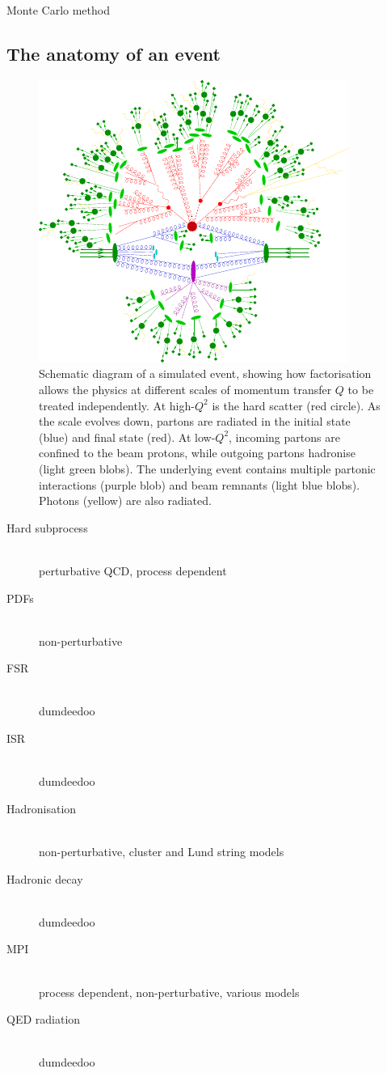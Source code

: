 
\cite{MCnet:general}

Monte Carlo method

\subsection{The anatomy of an event}

\begin{figure}
	\includegraphics[width=\largefigwidth]{tex/tools/event}
	\caption{Schematic diagram of a simulated \ttH event, showing how factorisation allows 
	the physics at different scales of momentum transfer $Q$ to be treated independently.
	At high-$Q^2$ is the hard scatter (red circle). As the scale evolves down, partons are 
	radiated in the initial state (blue) and final state (red). At low-$Q^2$, incoming 
	partons are confined to the beam protons, while outgoing partons hadronise (light 
	green blobs). The underlying event contains multiple partonic interactions (purple 
	blob) and beam remnants (light blue blobs). Photons (yellow) are also radiated.}
	\label{fig:mcevent}
\end{figure}

\begin{description}
\item[Hard subprocess] \hfill \\
	perturbative QCD, process dependent
\item[\acp{PDF}] \hfill \\
	non-perturbative
\item[\ac{FSR}] \hfill \\
	dumdeedoo
\item[\ac{ISR}] \hfill \\
	dumdeedoo
\item[Hadronisation] \hfill \\
	non-perturbative, cluster and Lund string models
\item[Hadronic decay] \hfill \\
	dumdeedoo
\item[\ac{MPI}] \hfill \\
	process dependent, non-perturbative, various models
\item[\acs{QED} radiation] \hfill \\
	dumdeedoo
\end{description}

